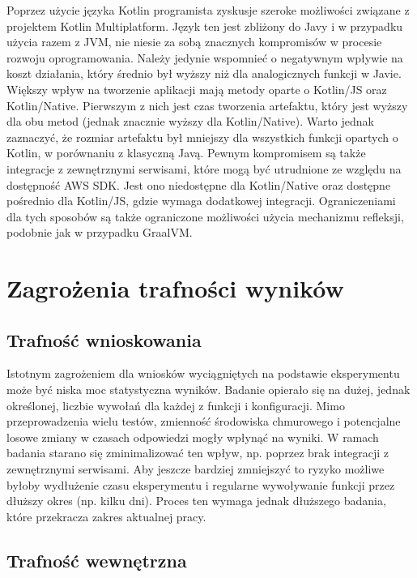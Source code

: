 Poprzez użycie języka Kotlin programista zyskusje szeroke możliwości związane z projektem Kotlin Multiplatform.
Język ten jest zbliżony do Javy i w przypadku użycia razem z JVM, nie niesie za sobą znacznych kompromisów w procesie rozwoju oprogramowania.
Należy jedynie wspomnieć o negatywnym wpływie na koszt działania, który średnio był wyższy niż dla analogicznych funkcji w Javie.
Większy wpływ na tworzenie aplikacji mają metody oparte o Kotlin/JS oraz Kotlin/Native.
Pierwszym z nich jest czas tworzenia artefaktu, który jest wyższy dla obu metod (jednak znacznie wyższy dla Kotlin/Native).
Warto jednak zaznaczyć, że rozmiar artefaktu był mniejszy dla wszystkich funkcji opartych o Kotlin, w porównaniu z klasyczną Javą.
Pewnym kompromisem są także integracje z zewnętrznymi serwisami, które mogą być utrudnione ze względu na dostępność AWS SDK.
Jest ono niedostępne dla Kotlin/Native oraz dostępne pośrednio dla Kotlin/JS, gdzie wymaga dodatkowej integracji.
Ograniczeniami dla tych sposobów są także ograniczone możliwości użycia mechanizmu refleksji, podobnie jak w przypadku GraalVM.

\section{Zagrożenia trafności wyników}\label{chapter:zagrozenia_trafnosci_wynikow}


\subsection*{Trafność wnioskowania}

Istotnym zagrożeniem dla wniosków wyciągniętych na podstawie eksperymentu może być niska moc statystyczna wyników. 
Badanie opierało się na dużej, jednak określonej, liczbie wywołań dla każdej z funkcji i konfiguracji. 
Mimo przeprowadzenia wielu testów, zmienność środowiska chmurowego i potencjalne losowe zmiany w czasach odpowiedzi mogły wpłynąć na wyniki. 
W ramach badania starano się zminimalizować ten wpływ, np. poprzez brak integracji z zewnętrznymi serwisami.
Aby jeszcze bardziej zmniejszyć to ryzyko możliwe byłoby wydłużenie czasu eksperymentu i regularne wywoływanie funkcji przez dłuższy okres (np. kilku dni).
Proces ten wymaga jednak dłuższego badania, które przekracza zakres aktualnej pracy.

\subsection*{Trafność wewnętrzna}

